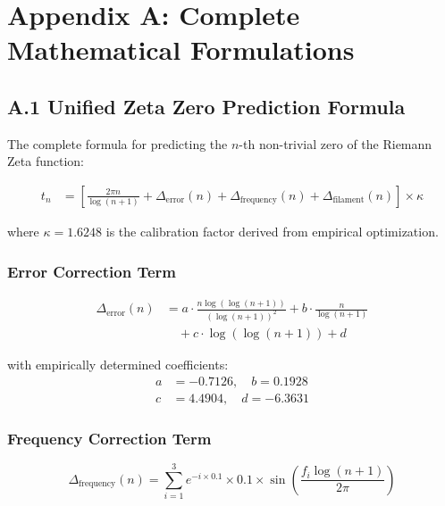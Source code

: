 
\section*{Appendix A: Complete Mathematical Formulations}

\subsection*{A.1 Unified Zeta Zero Prediction Formula}

The complete formula for predicting the $n$-th non-trivial zero of the Riemann Zeta function:

\begin{align}
t_n &= \left[\frac{2\pi n}{\log(n+1)} + \Delta_{\text{error}}(n) + \Delta_{\text{frequency}}(n) + \Delta_{\text{filament}}(n)\right] \times \kappa \label{eq:zeta_complete}
\end{align}

where $\kappa = 1.6248$ is the calibration factor derived from empirical optimization.

\subsubsection*{Error Correction Term}
\begin{align}
\Delta_{\text{error}}(n) &= a \cdot \frac{n \log(\log(n+1))}{(\log(n+1))^2} + b \cdot \frac{n}{\log(n+1)} \nonumber \\
&\quad + c \cdot \log(\log(n+1)) + d \label{eq:error_correction}
\end{align}

with empirically determined coefficients:
\begin{align}
a &= -0.7126, \quad b = 0.1928 \nonumber \\
c &= 4.4904, \quad d = -6.3631 \label{eq:error_coeffs}
\end{align}

\subsubsection*{Frequency Correction Term}
\begin{equation}
\Delta_{\text{frequency}}(n) = \sum_{i=1}^{3} e^{-i \times 0.1} \times 0.1 \times \sin\left(\frac{f_i \log(n+1)}{2\pi}\right) \label{eq:frequency_correction}
\end{equation}

